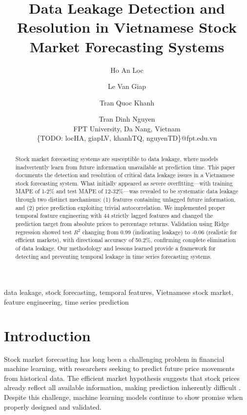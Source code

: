 \documentclass[conference]{IEEEtran}
\begin{document}
\title{Data Leakage Detection and Resolution in Vietnamese Stock Market Forecasting Systems}

\author{
    Ho An Loc \and Le Van Giap \and Tran Quoc Khanh \and Tran Dinh Nguyen\\
    FPT University, Da Nang, Vietnam\\
    \{TODO: locHA, giapLV, khanhTQ, nguyenTD\}@fpt.edu.vn
}

\maketitle

\begin{abstract}
Stock market forecasting systems are susceptible to data leakage, where models inadvertently learn from future information unavailable at prediction time. This paper documents the detection and resolution of critical data leakage issues in a Vietnamese stock forecasting system. What initially appeared as severe overfitting—with training MAPE of 1-2\% and test MAPE of 12-32\%—was revealed to be systematic data leakage through two distinct mechanisms: (1) features containing unlagged future information, and (2) price prediction exploiting trivial autocorrelation. We implemented proper temporal feature engineering with 44 strictly lagged features and changed the prediction target from absolute prices to percentage returns. Validation using Ridge regression showed test $R^2$ changing from 0.99 (indicating leakage) to -0.06 (realistic for efficient markets), with directional accuracy of 50.2\%, confirming complete elimination of data leakage. Our methodology and lessons learned provide a framework for detecting and preventing temporal leakage in time series forecasting systems.
\end{abstract}

\begin{IEEEkeywords}
data leakage, stock forecasting, temporal features, Vietnamese stock market, feature engineering, time series prediction
\end{IEEEkeywords}

\section{Introduction}

Stock market forecasting has long been a challenging problem in financial machine learning, with researchers seeking to predict future price movements from historical data. The efficient market hypothesis suggests that stock prices already reflect all available information, making prediction inherently difficult \cite{TODO_fama1970}. Despite this challenge, machine learning models continue to show promise when properly designed and validated.
\end{document}
